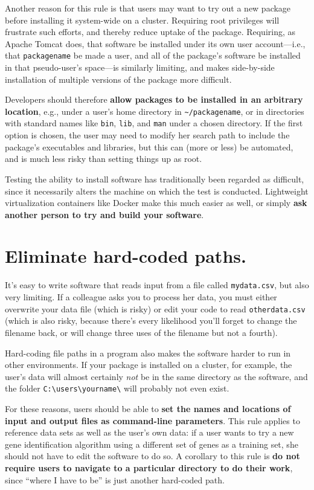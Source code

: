 \documentclass[10pt,letterpaper]{article}
\begin{document}
Another reason for this rule is that users may want to try out a new
package before installing it system-wide on a cluster. Requiring root
privileges will frustrate such efforts, and thereby reduce uptake of the
package. Requiring, as Apache Tomcat does, that software be installed
under its own user account---i.e.,
that \texttt{packagename} be made a user, and all of the
package's software be installed in that pseudo-user's space---is similarly limiting,
and makes side-by-side installation of multiple versions of
the package more difficult.

Developers should therefore
\textbf{allow packages to be installed in an arbitrary location},
e.g., under a user's home directory in
\texttt{\textasciitilde{}/packagename}, or in directories with standard
names like \texttt{bin}, \texttt{lib}, and \texttt{man} under a chosen
directory. If the first option is chosen, the user may need to modify
her search path to include the package's executables and libraries, but
this can (more or less) be automated, and is much less risky than
setting things up as root.

Testing the ability to install software has traditionally been regarded as difficult,
since it necessarily alters the machine on which the test is conducted.
Lightweight virtualization containers like Docker make this much easier as well, 
or simply \textbf{ask another person to try and build your software}.

\section{Eliminate hard-coded paths.}

It's easy to write software that reads input from a file called
\texttt{mydata.csv}, but also very limiting. If a colleague asks you to
process her data, you must either overwrite your data file (which is
risky) or edit your code to read \texttt{otherdata.csv} (which is also
risky, because there's every likelihood you'll forget to change the
filename back, or will change three uses of the filename but not a
fourth).

Hard-coding file paths in a program also makes the software harder to run
in other environments. If your package is installed on a cluster, for
example, the user's data will almost certainly \emph{not} be in the same
directory as the software, and the folder
\texttt{C:\textbackslash{}users\textbackslash{}yourname\textbackslash{}}
will probably not even exist.

For these reasons, users should be able to
\textbf{set the names and locations of input and output files as command-line parameters}.
This rule applies to reference data sets as well as the user's own
data: if a user wants to try a new gene identification algorithm using
a different set of genes as a training set, she should not have to
edit the software to do so.
A corollary to this rule is
\textbf{do not require users to navigate to a particular directory to do their work},
since ``where I have to be'' is just another hard-coded path.
\end{document}
